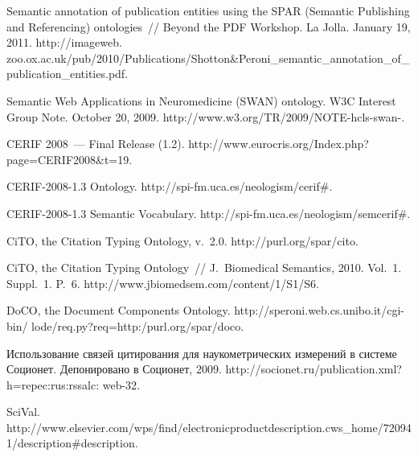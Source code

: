 \begin{multicols}{2}
{{\begin{thebibliography}{99}
Semantic annotation of publication entities using the SPAR (Semantic Publishing and Referencing) 
ontologies~// Beyond the PDF Workshop. La Jolla. January 19, 2011. {\sf 
http://imageweb. zoo.ox.ac.uk/pub/2010/Publications/Shotton\&Peroni\_\linebreak semantic\_annotation\_of\_publication\_entities.pdf}.

Semantic Web Applications in Neuromedicine (SWAN) ontology. W3C Interest Group Note. 
October 20, 2009. {\sf http://www.w3.org/TR/2009/NOTE-hcls-swan-}.

CERIF 2008~--- Final Release (1.2). {\sf 
http://www.\linebreak eurocris.org/Index.php?page=CERIF2008\&t=19}.

CERIF-2008-1.3 Ontology. {\sf http://spi-fm.uca.es/\linebreak neologism/cerif\#}.

CERIF-2008-1.3 Semantic Vocabulary. {\sf http://\linebreak spi-fm.uca.es/neologism/semcerif\#}.

CiTO, the Citation Typing Ontology, v.~2.0. {\sf http://purl.org/spar/cito}.

CiTO, the Citation Typing Ontology~// J.~Biomedical Semantics, 2010. Vol.~1. Suppl.~1. P.~6. 
{\sf http://www.jbiomedsem.com/content/1/S1/S6}.

DoCO, the Document Components Ontology. {\sf http://speroni.web.cs.unibo.it/cgi-bin/ lode/req.py?req=http:/purl.org/spar/doco}.

Использование связей цитирования для наукометрических измерений в системе Соционет. 
Депонировано в Соционет, 2009. {\sf 
http://socionet.ru/publication.xml?h=repec:rus:rssalc: web-32}.

\label{end\stat}

SciVal.  {\sf 
http://www.elsevier.com/wps/find/electronic\linebreak productdescription.cws\_home/720941/description\linebreak \#description}.
 \end{thebibliography}
}
}


\end{multicols}